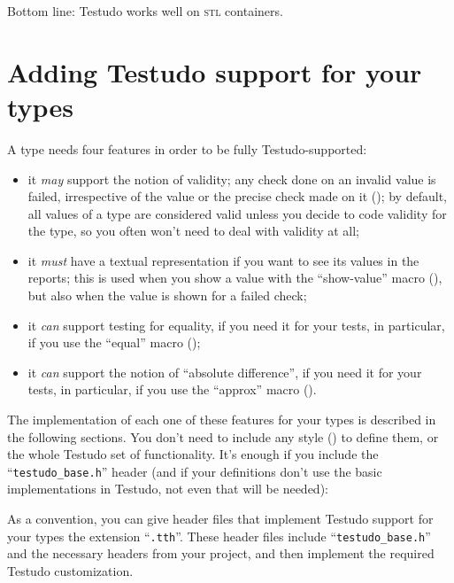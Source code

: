 \documentclass[twoside, a4paper, article]{memoir}
\newcommand\typesetexample[1]{%
  \typesetexamplesource{#1}
}
\providecommand\typesetexamplesource[1]{%
}
\begin{document}
Bottom line: Testudo works well on \textsc{stl} containers.


\chapter{Adding Testudo support for your types}
\label{cha:adding-testudo-support-your-types}

A type needs four features in order to be fully Testudo-supported:
\begin{itemize}
\item it \emph{may} support the notion of validity; any check done on an
  invalid value is failed, irrespective of the value or the precise check made
  on it (); by default, all values of a type
  are considered valid unless you decide to code validity for the type, so you
  often won't need to deal with validity at all;
\item it \emph{must} have a textual representation if you want to see its
  values in the reports; this is used when you show a value with the
  ``show-value'' macro (), but also when the value
  is shown for a failed check;
\item it \emph{can} support testing for equality, if you need it for your
  tests, in particular, if you use the ``equal'' macro
  ();
\item it \emph{can} support the notion of ``absolute difference'', if you need
  it for your tests, in particular, if you use the ``approx'' macro
  ().
\end{itemize}

The implementation of each one of these features for your types is described in
the following sections.  You don't need to include any style
() to define them, or the
whole Testudo set of functionality.  It's enough if you include the
``\texttt{testudo\_base.h}'' header (and if your definitions don't use the
basic implementations in Testudo, not even that will be needed):

\typesetexample{include-testudo-base}

As a convention, you can give header files that implement Testudo support for
your types the extension ``\texttt{.tth}''.  These header files include
``\texttt{testudo\_base.h}'' and the necessary headers from your project, and
then implement the required Testudo customization.
\end{document}
